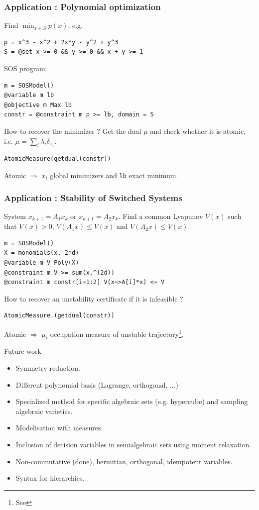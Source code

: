 \documentclass{beamer}
\begin{document}
  \begin{frame}[fragile]
    \frametitle{Application : Polynomial optimization}
      Find $\min_{x \in S} p(x)$, e.g.
\begin{verbatim}
p = x^3 - x^2 + 2x*y - y^2 + y^3
S = @set x >= 0 && y >= 0 && x + y >= 1
\end{verbatim}
      SOS program:
\begin{verbatim}
m = SOSModel()
@variable m lb
@objective m Max lb
constr = @constraint m p >= lb, domain = S
\end{verbatim}
      How to recover the minimizer ?
      Get the dual $\mu$ and check whether it is atomic, i.e.
      \( \mu = \sum_i \lambda_i \delta_{x_i} \).
\begin{verbatim}
AtomicMeasure(getdual(constr))
\end{verbatim}
      Atomic $\Rightarrow$ $x_i$ global minimizers and \verb|lb| exact minimum.
  \end{frame}
  \begin{frame}[fragile]
    \frametitle{Application : Stability of Switched Systems}
      System $x_{k+1} = A_1x_k$ or $x_{k+1} = A_2x_k$.
      Find a common Lyapunov $V(x)$ such that $V(x) > 0$, $V(A_1x) \leq V(x)$ and $V(A_2x) \leq V(x)$.
\begin{verbatim}
m = SOSModel()
X = monomials(x, 2*d)
@variable m V Poly(X)
@constraint m V >= sum(x.^(2d))
@constraint m constr[i=1:2] V(x=>A[i]*x) <= V
\end{verbatim}
      How to recover an unstability certificate if it is infeasible ?
\begin{verbatim}
AtomicMeasure.(getdual(constr))
\end{verbatim}
      Atomic $\Rightarrow$ $\mu_i$ occupation measure of unstable trajectory\footnote{See }.
  \end{frame}
  \begin{frame}{Future work}
    \begin{itemize}
      \item Symmetry reduction.
      \item Different polynomial basis (Lagrange, orthogonal, ...)
      \item Specialized method for specific algebraic sets (e.g. hypercube) and sampling algebraic varieties.
      \item Modelisation with measures.
      \item Inclusion of decision variables in semialgebraic sets using moment relaxation.
      \item Non-commutative (done), hermitian, orthogonal, idempotent variables.
      \item Syntax for hierarchies.
    \end{itemize}
  \end{frame}
\end{document}
